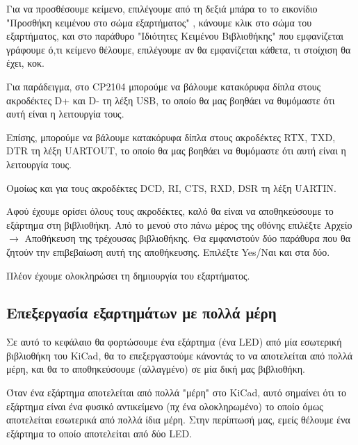 \documentclass[a4paper]{article}
\begin{document}
Για να προσθέσουμε κείμενο, επιλέγουμε από τη δεξιά μπάρα το το εικονίδιο "Προσθήκη κειμένου στο σώμα εξαρτήματος" %
, κάνουμε κλικ στο σώμα του εξαρτήματος, και στο παράθυρο "Ιδιότητες Κειμένου Βιβλιοθήκης" που εμφανίζεται γράφουμε ό,τι κείμενο θέλουμε, επιλέγουμε αν θα εμφανίζεται κάθετα, τι στοίχιση θα έχει, κοκ.

\begin{figure}
  \begin{center}
    \label{fig:kicad-main}
  \end{center}
\end{figure}

Για παράδειγμα, στο \textenglish{CP2104} μπορούμε να βάλουμε κατακόρυφα δίπλα στους ακροδέκτες D+ και D- τη λέξη USB, το οποίο θα μας βοηθάει να θυμόμαστε ότι αυτή είναι η λειτουργία τους.

Επίσης, μπορούμε να βάλουμε κατακόρυφα δίπλα στους ακροδέκτες RTX, TXD, DTR τη λέξη UARTOUT, το οποίο θα μας βοηθάει να θυμόμαστε ότι αυτή είναι η λειτουργία τους.

Ομοίως και για τους ακροδέκτες DCD, RI, CTS, RXD, DSR τη λέξη UARTΙΝ.

Αφού έχουμε ορίσει όλους τους ακροδέκτες, καλό θα είναι να αποθηκεύσουμε το εξάρτημα στη βιβλιοθήκη. Από το μενού στο πάνω μέρος της οθόνης επιλέξτε Αρχείο $\rightarrow$ Αποθήκευση της τρέχουσας βιβλιοθήκης. Θα εμφανιστούν δύο παράθυρα που θα ζητούν την επιβεβαίωση αυτή της αποθήκευσης. Επιλέξτε Yes/Ναι και στα δύο.

Πλέον έχουμε ολοκληρώσει τη δημιουργία του εξαρτήματος.


\subsection{Επεξεργασία εξαρτημάτων με πολλά μέρη}

Σε αυτό το κεφάλαιο θα φορτώσουμε ένα εξάρτημα (ένα \textenglish{LED}) από μία εσωτερική βιβλιοθήκη του \textenglish{KiCad}, θα το επεξεργαστούμε κάνοντάς το να αποτελείται από πολλά μέρη, και θα το αποθηκεύσουμε (αλλαγμένο) σε μία δική μας βιβλιοθήκη.

Όταν ένα εξάρτημα αποτελείται από πολλά "μέρη" στο \textenglish{KiCad}, αυτό σημαίνει ότι το εξάρτημα είναι ένα φυσικό αντικείμενο (πχ ένα ολοκληρωμένο) το οποίο όμως αποτελείται εσωτερικά από πολλά ίδια μέρη. Στην περίπτωσή μας, εμείς θέλουμε ένα εξάρτημα το οποίο αποτελείται από δύο \textenglish{LED}.
\end{document}
